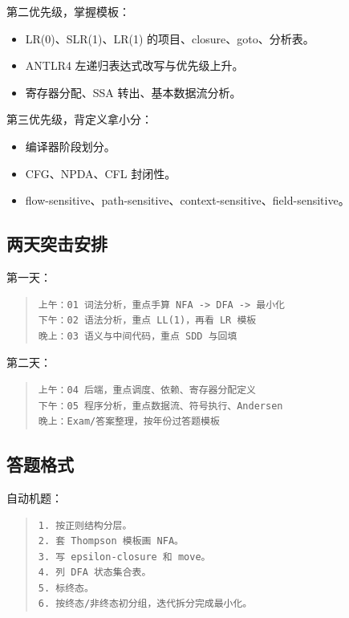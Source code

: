 \documentclass[UTF8,zihao=-4]{ctexart}
\begin{document}
第二优先级，掌握模板：


\begin{itemize}
\item LR(0)、SLR(1)、LR(1) 的项目、closure、goto、分析表。
\item ANTLR4 左递归表达式改写与优先级上升。
\item 寄存器分配、SSA 转出、基本数据流分析。
\end{itemize}


第三优先级，背定义拿小分：


\begin{itemize}
\item 编译器阶段划分。
\item CFG、NPDA、CFL 封闭性。
\item flow-sensitive、path-sensitive、context-sensitive、field-sensitive。
\end{itemize}


\subsection{两天突击安排}


第一天：


\begin{quote}
\footnotesize
\begin{verbatim}
上午：01 词法分析，重点手算 NFA -> DFA -> 最小化
下午：02 语法分析，重点 LL(1)，再看 LR 模板
晚上：03 语义与中间代码，重点 SDD 与回填
\end{verbatim}
\end{quote}


第二天：


\begin{quote}
\footnotesize
\begin{verbatim}
上午：04 后端，重点调度、依赖、寄存器分配定义
下午：05 程序分析，重点数据流、符号执行、Andersen
晚上：Exam/答案整理，按年份过答题模板
\end{verbatim}
\end{quote}


\subsection{答题格式}


自动机题：


\begin{quote}
\footnotesize
\begin{verbatim}
1. 按正则结构分层。
2. 套 Thompson 模板画 NFA。
3. 写 epsilon-closure 和 move。
4. 列 DFA 状态集合表。
5. 标终态。
6. 按终态/非终态初分组，迭代拆分完成最小化。
\end{verbatim}
\end{quote}
\end{document}
